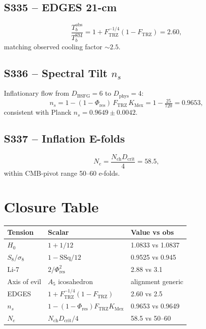 \documentclass[11pt]{article}
\newcommand{\Ftrz}{F_{\mathrm{TRZ}}}
\newcommand{\Phires}{\Phi_{\mathrm{res}}}
\newcommand{\KMex}{K_{\mathrm{Mex}}}
\newcommand{\Dphys}{D_{\mathrm{phys}}}
\newcommand{\Dbsfg}{D_{\mathrm{BSFG}}}
\newcommand{\Dcrit}{D_{\mathrm{crit}}}
\newcommand{\Nch}{N_{\mathrm{ch}}}
\newcommand{\SSq}{\mathrm{SSq}}
\begin{document}
\subsection{S335 -- EDGES 21-cm}
\begin{equation}
\frac{T_b^{\text{obs}}}{T_b^{\text{SM}}}=1+\Ftrz^{-1/4}(1-\Ftrz)=2.60,
\end{equation}
matching observed cooling factor $\sim2.5$.

\subsection{S336 -- Spectral Tilt $n_s$}
Inflationary flow from $\Dbsfg=6$ to $\Dphys=4$:
\begin{equation}
n_s=1-(1-\Phires)\,\Ftrz\,\KMex=1-\tfrac{25}{720}=0.9653,
\end{equation}
consistent with Planck $n_s=0.9649\pm0.0042$.

\subsection{S337 -- Inflation E-folds}
\begin{equation}
N_e=\frac{\Nch\Dcrit}{4}=58.5,
\end{equation}
within CMB-pivot range 50--60 e-folds.

\section{Closure Table}
\begin{table}[h!]
\centering
\begin{tabular}{lll}
\toprule
Tension & Scalar & Value vs obs \\
\midrule
$H_0$            & $1+1/12$           & 1.0833 vs 1.0837 \\
$S_8/\sigma_8$    & $1-\SSq/12$        & 0.9525 vs 0.945 \\
Li-7              & $2/\Phires^{2}$    & 2.88 vs 3.1 \\
Axis of evil      & $A_5$ icosahedron  & alignment generic \\
EDGES             & $1+\Ftrz^{-1/4}(1-\Ftrz)$ & 2.60 vs 2.5 \\
$n_s$             & $1-(1-\Phires)\Ftrz\KMex$    & 0.9653 vs 0.9649 \\
$N_e$             & $\Nch\Dcrit/4$            & 58.5 vs 50--60 \\
\bottomrule
\end{tabular}
\end{table}
\end{document}
